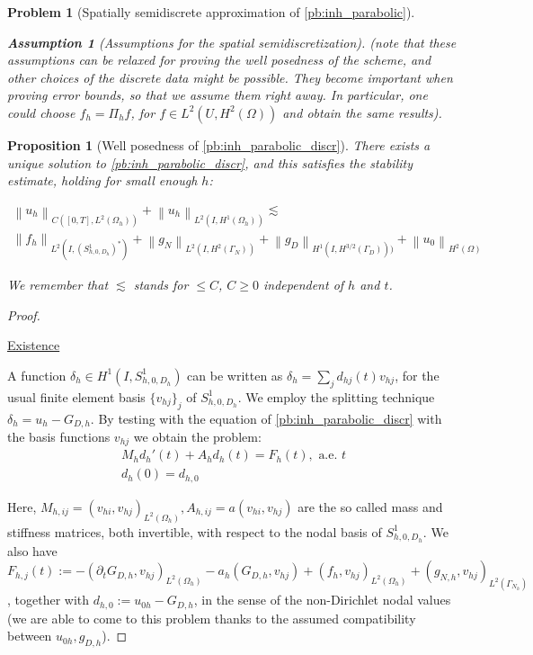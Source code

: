 \documentclass[english,a4paper,9pt,oneside]{scrbook}	%
\theoremstyle{break}
\newtheorem{prop}[equation]{Proposition}
\newtheorem{ass}[equation]{Assumption}
\newtheorem{pb}[equation]{Problem}
\newenvironment{mproof}[1][\proofname]{%
  \begin{proof}[#1]$ $\par\nobreak\ignorespaces
}{%
  \end{proof}
}
\renewcommand*{\proofname}{Proof}
\theoremstyle{remark}
\newcommand{\norm}[1]{\left\lVert#1\right\rVert}
\begin{document}
\begin{appendices}
\begin{pb}[Spatially semidiscrete approximation of \cref{pb:inh_parabolic}]
\begin{ass}[Assumptions for the spatial semidiscretization]
(note that these assumptions can be relaxed for proving the well posedness of the scheme, and other choices of the discrete data might be possible. They become important when proving error bounds, so that we assume them right away. In particular, one could choose $f_h=\Pi_h f$, for $f\in L^2(U, H^2(\Omega))$ and obtain the same results).

\end{ass}

\end{pb}

\begin{prop}[Well posedness of \cref{pb:inh_parabolic_discr}]
\label{prop:wp_discr_par}
There exists a unique solution to \cref{pb:inh_parabolic_discr}, and this satisfies the stability estimate, holding for small enough $h$:

\begin{align*}
	\norm{u_h}_{C([0,T],L^2(\Omega_h))} + \norm{u_h}_{L^2(I,H^1(\Omega_h))}\lesssim \\\norm{f_h}_{L^2(I,(S^1_{h,0,D_h})^*)}  + \norm{g_{N}}_{L^2(I,H^2(\Gamma_{N}))} + \norm{g_D}_{H^1(I,H^{3/2}(\Gamma_D)))} + \norm{u_{0}}_{H^2(\Omega)}
\end{align*}

We remember that $\lesssim$ stands for $\leq C$, $C\geq 0$ independent of $h$ and $t$.

\end{prop}

\begin{mproof}

\underline{Existence}

A function $\delta_h \in H^1(I, S^1_{h,0,D_h})$ can be written as $\delta_h=\sum_j d_{hj}(t)v_{hj}$, for the usual finite element basis $\{v_{hj}\}_j$ of $S^1_{h,0,D_h}$. We employ the splitting technique $\delta_h = u_h - G_{D,h}$. By testing with the equation of \cref{pb:inh_parabolic_discr} with the basis functions $v_{hj}$ we obtain the problem:
\begin{align}
\label{eqn:ode}
	M_h d_h'(t)+A_hd_h(t)= F_h(t), \text{ a.e. } t\\
	d_h(0) = d_{h,0}	
\end{align}

Here, $M_{h,ij} = (v_{hi}, v_{hj})_{L^2(\Omega_h)}, A_{h,ij} = a(v_{hi}, v_{hj})$ are the so called mass and stiffness matrices, both invertible, with respect to the nodal basis of $S^1_{h,0,D_h}$. We also have $F_{h,j}(t):= - (\partial_t G_{D,h}, v_{hj})_{L^2(\Omega_h)} - a_h(G_{D,h}, v_{hj}) + (f_h, v_{hj})_{L^2(\Omega_h)} + (g_{N,h}, v_{hj})_{L^2(\Gamma_{N_h})}$, together with $d_{h,0}:= u_{0h} - G_{D,h}$, in the sense of the non-Dirichlet nodal values (we are able to come to this problem thanks to the assumed compatibility between $u_{0h}, g_{D,h}$).


\end{mproof}
\end{appendices}
\end{document}

